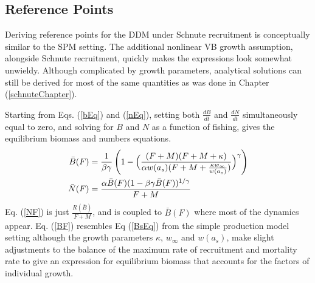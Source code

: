 %
\subsection{Reference Points\label{ddmRP}}

%
Deriving reference points for the DDM under Schnute recruitment is
conceptually similar to the SPM setting. The additional nonlinear
VB growth assumption, alongside Schnute recruitment, quickly makes the
expressions look somewhat unwieldy. Although complicated by growth parameters, 
analytical solutions can still be derived for most of the same quantities as 
was done in Chapter (\ref{schnuteChapter}). 

%
Starting from Eqs. (\ref{bEq}) and (\ref{nEq}), setting both $\frac{dB}{dt}$
and $\frac{dN}{dt}$ simultaneously equal to zero, and solving for $B$ and $N$
as a function of fishing, gives the equilibrium biomass and numbers equations.
%
\begin{align}
\bar{B}(F) &= \frac{1}{\beta\gamma} \left( 1 - \Big(\frac{(F + M) (F + M + \kappa)}{\alpha w(a_s)(F + M + \frac{\kappa w_\infty}{w(a_s)})}\Big)^\gamma\right) \label{BF}\\
\bar{N}(F) &= \frac{\alpha\bar{B}(F)(1-\beta\gamma\bar{B}(F))^{1/\gamma}}{F+M} \label{NF}
\end{align}
%
Eq. (\ref{NF}) is just $\frac{R(\bar{B})}{F+M}$, and is coupled to $\bar{B}(F)$
where most of the dynamics appear. Eq. (\ref{BF}) resembles Eq (\ref{BsEq})
from the simple production model setting although the growth parameters
$\kappa$, $w_\infty$ and $w(a_s)$, make slight adjustments to the balance of the
maximum rate of recruitment and mortality rate to give an expression for
equilibrium biomass that accounts for the factors of individual growth.

